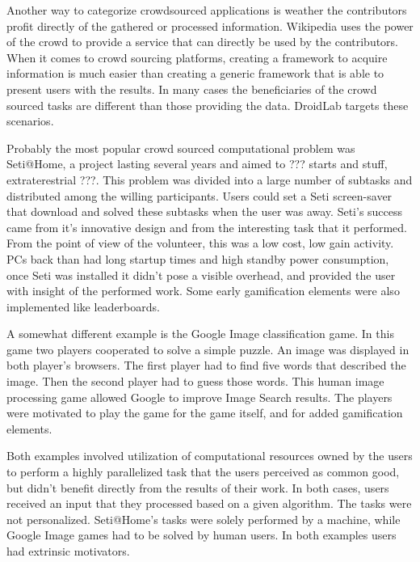 \documentclass[conference,letterpaper]{IEEEtran}
\begin{document}
Another way to categorize crowdsourced applications is weather the contributors profit directly of the gathered or processed information. Wikipedia uses the power of the crowd to provide a service that can directly be used by the contributors. When it comes to crowd sourcing platforms, creating a framework to acquire information is much easier than creating a generic framework that is able to present users with the results. In many cases the beneficiaries of the crowd sourced tasks are different than those providing the data. DroidLab targets these scenarios.

Probably the most popular crowd sourced computational problem was Seti@Home, a project lasting several years and aimed to ??? starts and stuff, extraterestrial ???. This problem was divided into a large number of subtasks and distributed among the willing participants. Users could set a Seti screen-saver that download and solved these subtasks when the user was away. Seti's success came from it's innovative design and from the interesting task that it performed. From the point of view of the volunteer, this was a low cost, low gain activity. PCs back than had long startup times and high standby power consumption, once Seti was installed it didn't pose a visible overhead, and provided the user with insight of the performed work. Some early gamification elements were also implemented like leaderboards.

A somewhat different example is the Google Image classification game. In this game two players cooperated to solve a simple puzzle. An image was displayed in both player's browsers. The first player had to find five words that described the image. Then the second player had to guess those words. This human image processing game allowed Google to improve Image Search results. The players were motivated to play the game for the game itself, and for added gamification elements.

Both examples involved utilization of computational resources owned by the users to perform a highly parallelized task that the users perceived as common good, but didn't benefit directly from the results of their work. In both cases, users received an input that they processed based on a given algorithm. The tasks were not personalized. Seti@Home's tasks were solely performed by a machine, while Google Image games had to be solved by human users. In both examples users had extrinsic motivators.
\end{document}
